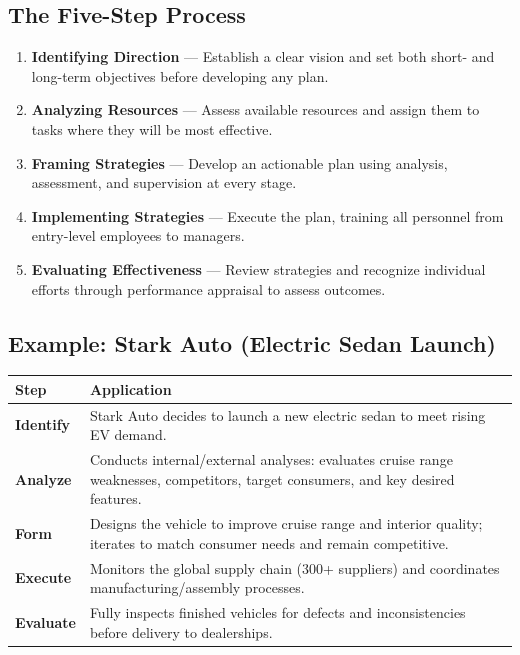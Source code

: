 \documentclass[11pt, letterpaper]{article}
\begin{document}
\subsection{The Five-Step Process}

\begin{enumerate}[leftmargin=*, label=\textbf{Step \arabic*.}]
  \item \textbf{Identifying Direction} --- Establish a clear vision and set both short- and long-term objectives before developing any plan.
  \item \textbf{Analyzing Resources} --- Assess available resources and assign them to tasks where they will be most effective.
  \item \textbf{Framing Strategies} --- Develop an actionable plan using analysis, assessment, and supervision at every stage.
  \item \textbf{Implementing Strategies} --- Execute the plan, training all personnel from entry-level employees to managers.
  \item \textbf{Evaluating Effectiveness} --- Review strategies and recognize individual efforts through performance appraisal to assess outcomes.
\end{enumerate}

\subsection{Example: Stark Auto (Electric Sedan Launch)}

\begin{center}
\begin{tabular}{>{\bfseries}p{2.2cm} p{10cm}}
\toprule
Step & Application \\
\midrule
Identify & Stark Auto decides to launch a new electric sedan to meet rising EV demand. \\
\addlinespace
Analyze & Conducts internal/external analyses: evaluates cruise range weaknesses, competitors, target consumers, and key desired features. \\
\addlinespace
Form & Designs the vehicle to improve cruise range and interior quality; iterates to match consumer needs and remain competitive. \\
\addlinespace
Execute & Monitors the global supply chain (300+ suppliers) and coordinates manufacturing/assembly processes. \\
\addlinespace
Evaluate & Fully inspects finished vehicles for defects and inconsistencies before delivery to dealerships. \\
\bottomrule
\end{tabular}
\end{center}
\end{document}
